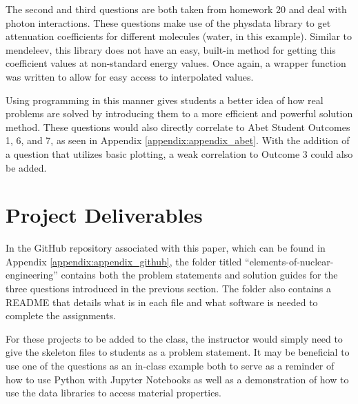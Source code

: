 The second and third questions are both taken from homework 20 and deal with photon interactions. 
These questions make use of the physdata library to get attenuation coefficients for different
molecules (water, in this example). Similar to mendeleev, this library does not have an easy, 
built-in method for getting this coefficient values at non-standard energy values. Once again, a
wrapper function was written to allow for easy access to interpolated values.

Using programming in this manner gives students a better idea of how real problems are solved by
introducing them to a more efficient and powerful solution method. These questions would also 
directly correlate to Abet Student Outcomes 1, 6, and 7, as seen in Appendix 
\ref{appendix:appendix_abet}. With the addition of a question that utilizes basic plotting, a 
weak correlation to Outcome 3 could also be added.

\section{Project Deliverables}

In the GitHub repository associated with this paper, which can be found in 
Appendix \ref{appendix:appendix_github}, the folder titled ``elements-of-nuclear-engineering''
contains both the problem statements and solution guides for the three questions introduced in 
the previous section. The folder also contains a README that details what is in each file and 
what software is needed to complete the assignments. 

For these projects to be added to the class, the instructor would simply need to give the 
skeleton files to students as a problem statement. It may be beneficial to use one of the questions 
as an in-class example both to serve as a reminder of how to use Python with Jupyter Notebooks 
as well as a demonstration of how to use the data libraries to access material properties.